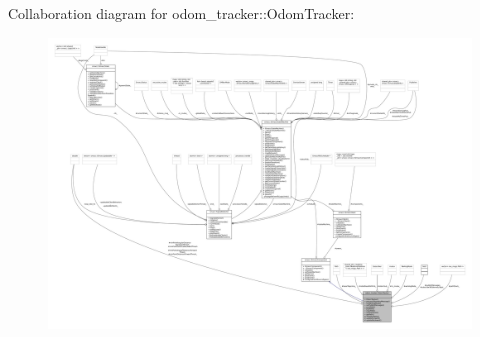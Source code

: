 Collaboration diagram for odom\+\_\+tracker\+:\+:Odom\+Tracker\+:
\nopagebreak
\begin{figure}[H]
\begin{center}
\leavevmode
\includegraphics[width=350pt]{classodom__tracker_1_1OdomTracker__coll__graph}
\end{center}
\end{figure}
